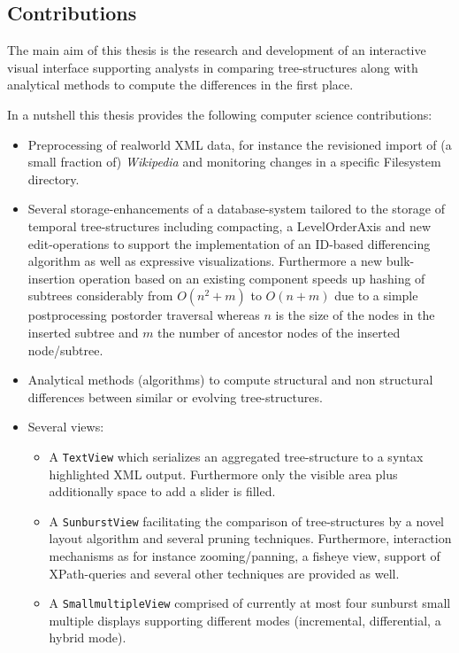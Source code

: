 \subsection{Contributions}
The main aim of this thesis is the research and development of an interactive visual interface supporting analysts in comparing tree-structures along with analytical methods to compute the differences in the first place.

In a nutshell this thesis provides the following computer science contributions:

\begin{itemize}
\item Preprocessing of realworld XML data, for instance the revisioned import of (a small fraction of) \emph{Wikipedia} and monitoring changes in a specific Filesystem directory.
\item Several storage-enhancements of a database-system tailored to the storage of temporal tree-structures including compacting, a LevelOrderAxis and new edit-operations to support the implementation of an ID-based differencing algorithm as well as expressive visualizations. Furthermore a new bulk-insertion operation based on an existing component speeds up hashing of subtrees considerably from $O(n^2+m)$ to $O(n+m)$ due to a simple postprocessing postorder traversal whereas $n$ is the size of the nodes in the inserted subtree and $m$ the number of ancestor nodes of the inserted node/subtree.
\item Analytical methods (algorithms) to compute structural and non structural differences between similar or evolving tree-structures.
\item Several views:
\begin{itemize}
\item A \texttt{TextView} which serializes an aggregated tree-structure to a syntax highlighted XML output. Furthermore only the visible area plus additionally space to add a slider is filled.
\item A \texttt{SunburstView} facilitating the comparison of tree-structures by a novel layout algorithm and several pruning techniques. Furthermore, interaction mechanisms as for instance zooming/panning, a fisheye view, support of XPath-queries and several other techniques are provided as well.
\item A \texttt{SmallmultipleView} comprised of currently at most four sunburst small multiple displays supporting different modes (incremental, differential, a hybrid mode).
\end{itemize}
\end{itemize}


